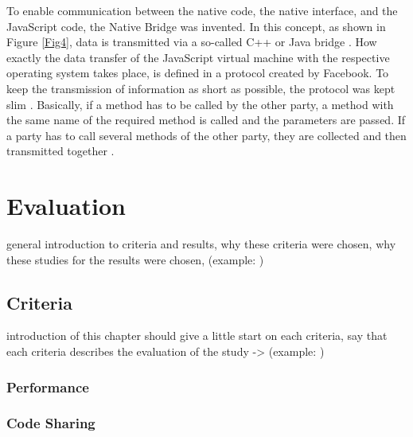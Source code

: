 \documentclass[Bachelor,BIF,english]{twbook}
\begin{document}
To enable communication between the native code, the native interface, and the JavaScript code, the Native Bridge was invented. In this concept, as shown in Figure \ref{Fig4}, data is transmitted via a so-called C++ or Java bridge \cite[p.~28]{ZubaBernhard2017EdPb}. How exactly the data transfer of the JavaScript virtual machine with the respective operating system takes place, is defined in a protocol created by Facebook. To keep the transmission of information as short as possible, the protocol was kept slim \cite[p.~9-10]{Hansson_Vidhall_2016} \cite[p.~28]{ZubaBernhard2017EdPb}. Basically, if a method has to be called by the other party, a method with the same name of the required method is called and the parameters are passed. If a party has to call several methods of the other party, they are collected and then transmitted together \cite[p.~29]{ZubaBernhard2017EdPb}.

\chapter{Evaluation}
general introduction to criteria and results, why these criteria were chosen, why these studies for the results were chosen, (example: \cite[p.~24]{Danielsson_2016})

\section{Criteria}
introduction of this chapter should give a little start on each criteria, say that each criteria describes the evaluation of the study -> (example: \cite[p.~24]{Danielsson_2016})

\subsection{Performance}
\cite[p.~25-26]{Danielsson_2016} \cite[p.~30]{Axelsson2016} \cite[p.~29-31]{Hansson_Vidhall_2016}

\subsection{Code Sharing}
\cite[p.~31]{Hansson_Vidhall_2016}
\end{document}
